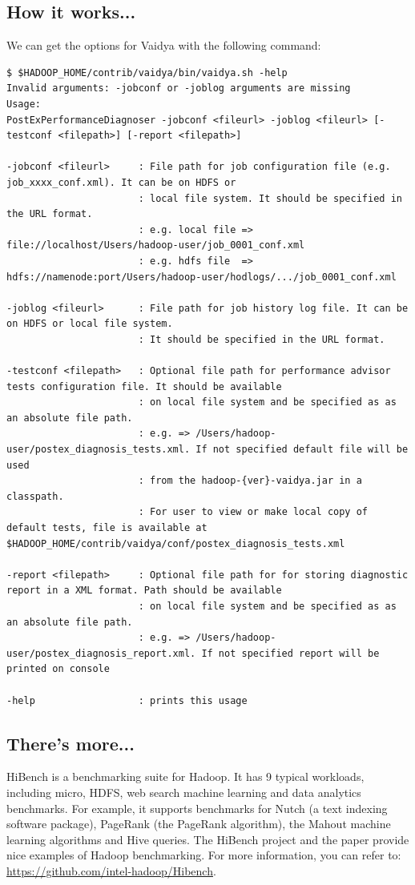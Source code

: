 \subsection*{How it works...}
We can get the options for Vaidya with the following command:
\lstset{style=bashstyle}
\begin{lstlisting}
$ $HADOOP_HOME/contrib/vaidya/bin/vaidya.sh -help
Invalid arguments: -jobconf or -joblog arguments are missing
Usage:
PostExPerformanceDiagnoser -jobconf <fileurl> -joblog <fileurl> [-testconf <filepath>] [-report <filepath>]

-jobconf <fileurl>     : File path for job configuration file (e.g. job_xxxx_conf.xml). It can be on HDFS or
                       : local file system. It should be specified in the URL format.
                       : e.g. local file => file://localhost/Users/hadoop-user/job_0001_conf.xml
                       : e.g. hdfs file  => hdfs://namenode:port/Users/hadoop-user/hodlogs/.../job_0001_conf.xml

-joblog <fileurl>      : File path for job history log file. It can be on HDFS or local file system.
                       : It should be specified in the URL format.

-testconf <filepath>   : Optional file path for performance advisor tests configuration file. It should be available
                       : on local file system and be specified as as an absolute file path.
                       : e.g. => /Users/hadoop-user/postex_diagnosis_tests.xml. If not specified default file will be used
                       : from the hadoop-{ver}-vaidya.jar in a classpath.
                       : For user to view or make local copy of default tests, file is available at $HADOOP_HOME/contrib/vaidya/conf/postex_diagnosis_tests.xml

-report <filepath>     : Optional file path for for storing diagnostic report in a XML format. Path should be available
                       : on local file system and be specified as as an absolute file path.
                       : e.g. => /Users/hadoop-user/postex_diagnosis_report.xml. If not specified report will be printed on console

-help                  : prints this usage
\end{lstlisting}
\subsection*{There's more...}
HiBench is a benchmarking suite for Hadoop. It has 9 typical workloads, including micro, HDFS, web search machine learning and data analytics benchmarks. For example, it supports benchmarks for Nutch (a text indexing software package), PageRank (the PageRank algorithm), the Mahout machine learning algorithms and Hive queries.
The HiBench project and the paper provide nice examples of Hadoop benchmarking. For more information, you can refer to: \url{https://github.com/intel-hadoop/Hibench}.
